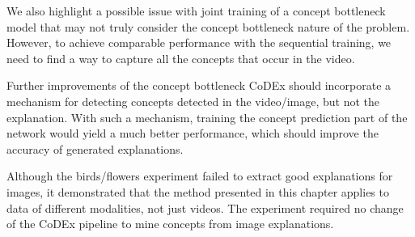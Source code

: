 We also highlight a possible issue with joint training of a concept bottleneck model that may not truly consider the concept bottleneck nature of the problem.
However, to achieve comparable performance with the sequential training, we need to find a way to capture all the concepts that occur in the video.

Further improvements of the concept bottleneck CoDEx should incorporate a mechanism for detecting concepts detected in the video/image, but not the explanation.
With such a mechanism, training the concept prediction part of the network would yield a much better performance, which should improve the accuracy of generated explanations.

Although the birds/flowers experiment failed to extract good explanations for images, it demonstrated that the method presented in this chapter applies to data of different modalities, not just videos.
The experiment required no change of the CoDEx pipeline to mine concepts from image explanations.
